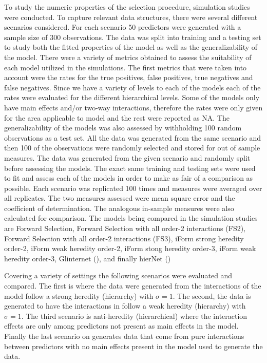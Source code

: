 \documentclass[]{book}
\theoremstyle{definition}
\theoremstyle{definition}
\theoremstyle{remark}
\begin{document}
To study the numeric properties of the selection procedure, simulation
studies were conducted. To capture relevant data structures, there were
several different scenarios considered. For each scenario 50 predictors
were generated with a sample size of 300 observations. The data was
split into training and a testing set to study both the fitted
properties of the model as well as the generalizability of the model.
There were a variety of metrics obtained to assess the suitability of
each model utilized in the simulations. The first metrics that were
taken into account were the rates for the true positives, false
positives, true negatives and false negatives. Since we have a variety
of levels to each of the models each of the rates were evaluated for the
different hierarchical levels. Some of the models only have main effects
and/or two-way interactions, therefore the rates were only given for the
area applicable to model and the rest were reported as NA. The
generalizability of the models was also assessed by withholding 100
random observations as a test set. All the data was generated from the
same scenario and then 100 of the observations were randomly selected
and stored for out of sample measures. The data was generated from the
given scenario and randomly split before assessing the models. The exact
same training and testing sets were used to fit and assess each of the
models in order to make as fair of a comparison as possible. Each
scenario was replicated 100 times and measures were averaged over all
replicates. The two measures assessed were mean square error and the
coefficient of determination. The analogous in-sample measures were also
calculated for comparison. The models being compared in the simulation
studies are Forward Selection, Forward Selection with all order-2
interactions (FS2), Forward Selection with all order-2 interactions
(FS3), iForm strong heredity order-2, iForm weak heredity order-2, iForm
stong heredity order-3, iForm weak heredity order-3, Glinternet
(\cite{bien2013lasso}), and finally hierNet (\cite{lim2015learning})

Covering a variety of settings the following scenarios were evaluated
and compared. The first is where the data were generated from the
interactions of the model follow a strong heredity (hierarchy) with
\(\sigma = 1\). The second, the data is generated to have the
interactions in follow a weak heredity (hierarchy) with \(\sigma = 1\).
The third scenario is anti-heredity (hierarchical) where the interaction
effects are only among predictors not present as main effects in the
model. Finally the last scenario on generates data that come from pure
interactions between predictors with no main effects present in the
model used to generate the data.
\end{document}
